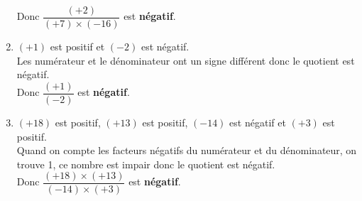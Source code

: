\begin{corrige}
\begin{multicols}
\begin{enumerate}
          Donc $ \dfrac{(+2)}{(+7) \times (-16)} $ est {\bfseries \color[HTML]{f15929}négatif}.
            \item $ (+1) $ est positif et $ (-2) $ est négatif.\\
           Les numérateur et le dénominateur ont un signe différent donc le quotient est négatif.\\
          Donc $ \dfrac{(+1)}{(-2)} $ est {\bfseries \color[HTML]{f15929}négatif}.
            \item $ (+18) $ est positif, $ (+13) $ est positif, $ (-14) $ est négatif et $ (+3) $ est positif.\\
           Quand on compte les facteurs négatifs du numérateur et du dénominateur, on trouve 1, ce nombre est impair donc le quotient est négatif.\\
          Donc $ \dfrac{(+18) \times (+13)}{(-14) \times (+3)} $ est {\bfseries \color[HTML]{f15929}négatif}.                
        \end{enumerate}
      \end{multicols}
\end{corrige}

